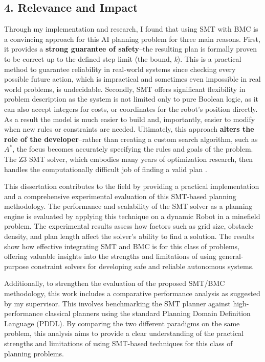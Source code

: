 \documentclass[12pt, a4paper, oneside]{report} %
\begin{document}
\subsection*{4. Relevance and Impact}
Through my implementation and research, I found that using SMT with BMC is a convincing approach for this AI planning problem for three main reasons. First, it provides a \textbf{strong guarantee of safety}--the resulting plan is formally proven to be correct up to the defined step limit (the bound, \textit{k}). This is a practical method to guarantee reliability in real-world systems since checking every possible future action, which is impractical and sometimes even impossible in real world problems, is undecidable. Secondly, SMT offers significant flexibility in problem description as the system is not limited only to pure Boolean logic, as it can also accept integers for costs, or coordinates for the robot’s position directly. As a result the model is much easier to build and, importantly, easier to modify when new rules or constraints are needed. Ultimately, this approach \textbf{alters the role of the developer}--rather than creating a custom search algorithm, such as $A^*$, the focus becomes accurately specifying the rules and goals of the problem. The Z3 SMT solver, which embodies many years of optimization research, then handles the computationally difficult job of finding a valid plan \cite{demoura2011smt}.

This dissertation contributes to the field by providing a practical implementation and a comprehensive experimental evaluation of this SMT-based planning methodology. The performance and scalability of the SMT solver as a planning engine is evaluated by applying this technique on a dynamic Robot in a minefield problem. The experimental results assess how factors such as grid size, obstacle density, and plan length affect the solver’s ability to find a solution. The results show how effective integrating SMT and BMC is for this class of problems, offering valuable insights into the strengths and limitations of using general-purpose constraint solvers for developing safe and reliable autonomous systems.

Additionally, to strengthen the evaluation of the proposed SMT/BMC methodology, this work includes a comparative performance analysis as suggested by my supervisor. This involves benchmarking the SMT planner against high-performance classical planners using the standard Planning Domain Definition Language (PDDL). By comparing the two different paradigms on the same problem, this analysis aims to provide a clear understanding of the practical strengths and limitations of using SMT-based techniques for this class of planning problems.
\end{document}
